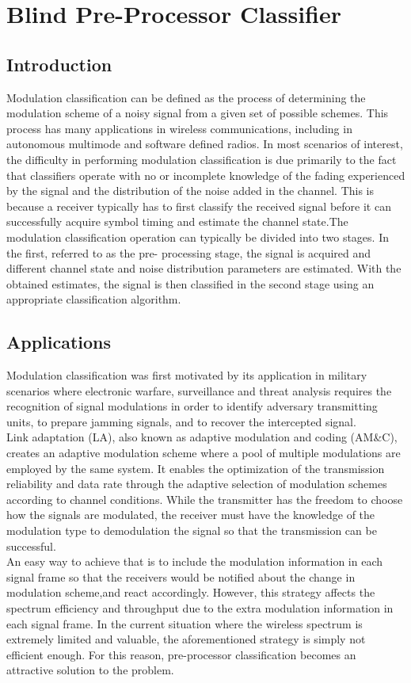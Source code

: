 \chapter{Blind Pre-Processor Classifier}

\section{Introduction}
Modulation classification can be defined as the process of determining the modulation scheme of a noisy signal from a given set of possible schemes. This process has many applications in wireless communications, including in autonomous multimode and software defined radios. In most scenarios of interest, the difficulty in performing modulation classification is due primarily to the fact that classifiers operate with no or incomplete knowledge of the fading experienced by the signal and the distribution of the noise added in the channel. This is because a receiver typically has to first classify the received signal before it can successfully acquire symbol timing and estimate the channel state.The modulation classification operation can typically be divided into two stages. In the first, referred to as the pre- processing stage, the signal is acquired and different channel state and noise distribution parameters are estimated. With the obtained estimates, the signal is then classified in the second stage using an appropriate classification algorithm.

\newpage
\section{Applications}
Modulation classification was first motivated by its application in military scenarios where electronic warfare, surveillance and threat analysis requires the recognition of signal modulations in order to identify adversary transmitting units, to prepare jamming signals, and to recover the intercepted signal.\\
Link adaptation (LA), also known as adaptive modulation and coding (AM\&C), creates an adaptive modulation scheme where a pool of multiple modulations are employed by the same system. It enables the optimization of the transmission reliability and data rate through the adaptive selection of modulation schemes according to channel conditions. While the transmitter has the freedom to choose how the signals are modulated, the receiver must have the knowledge of the modulation type to demodulation the signal so that the transmission can be successful.\\
An easy way to achieve that is to include the modulation information in each signal frame so that the receivers would be notified about the change in modulation scheme,and react accordingly. However, this strategy affects the spectrum efficiency and throughput due to the extra modulation information in each signal frame. In the current situation where the wireless spectrum is extremely limited and valuable, the aforementioned strategy is simply not efficient enough. For this reason, pre-processor classification becomes an attractive solution to the problem.

